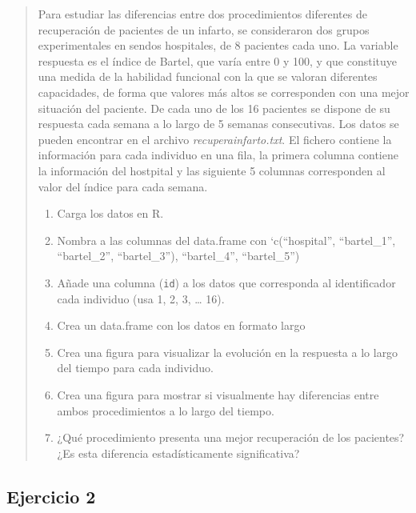 \documentclass[
]{book}
\providecommand{\tightlist}{%
  \setlength{\itemsep}{0pt}\setlength{\parskip}{0pt}}
\begin{document}
\begin{quote}
Para estudiar las diferencias entre dos procedimientos diferentes de recuperación de pacientes de un infarto, se consideraron dos grupos experimentales en sendos hospitales, de 8 pacientes cada uno. La variable respuesta es el índice de Bartel, que varía entre 0 y 100, y que constituye una medida de la habilidad funcional con la que se valoran diferentes capacidades, de forma que valores más altos se corresponden con una mejor situación del paciente. De cada uno de los 16 pacientes se dispone de su respuesta cada semana a lo largo de 5 semanas consecutivas. Los datos se pueden encontrar en el archivo \emph{recuperainfarto.txt}. El fichero contiene la información para cada individuo en una fila, la primera columna contiene la información del hostpital y las siguiente 5 columnas corresponden al valor del índice para cada semana.

\begin{enumerate}
\def\labelenumi{\arabic{enumi}.}
\tightlist
\item
  Carga los datos en R.
\item
  Nombra a las columnas del data.frame con `c(``hospital'', ``bartel\_1'', ``bartel\_2'', ``bartel\_3''), ``bartel\_4'', ``bartel\_5'')
\item
  Añade una columna (\texttt{id}) a los datos que corresponda al identificador cada individuo (usa 1, 2, 3, \ldots{} 16).
\item
  Crea un data.frame con los datos en formato largo
\item
  Crea una figura para visualizar la evolución en la respuesta a lo largo del tiempo para cada individuo.
\item
  Crea una figura para mostrar si visualmente hay diferencias entre ambos procedimientos a lo largo del tiempo.
\item
  ¿Qué procedimiento presenta una mejor recuperación de los pacientes? ¿Es esta diferencia estadísticamente significativa?
\end{enumerate}
\end{quote}

\hypertarget{ejercicio-2}{%
\subsection{Ejercicio 2}\label{ejercicio-2}}
\end{document}
